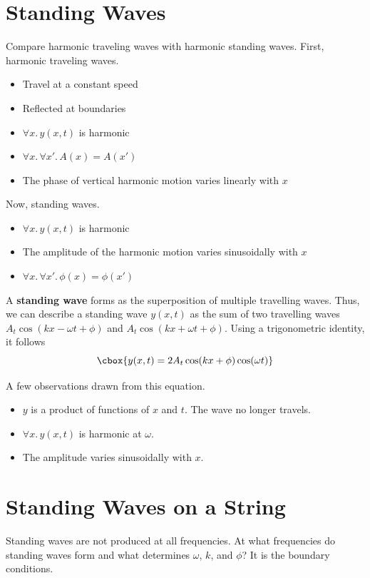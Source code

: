 \documentclass{hw}
\renewcommand\emph[1]{{\bf\color{BlueViolet}#1}}
\begin{document}
\section{Standing Waves}
Compare harmonic traveling waves with harmonic standing waves. First, harmonic
traveling waves.
\begin{itemize}
  \item Travel at a constant speed
  \item Reflected at boundaries
  \item $\forall x.\, y(x, t)$ is harmonic
  \item $\forall x.\, \forall x'.\, A(x) = A(x')$
  \item The phase of vertical harmonic motion varies linearly with $x$
\end{itemize}
Now, standing waves.
\begin{itemize}
  \item $\forall x.\, y(x, t)$ is harmonic
  \item The amplitude of the harmonic motion varies sinusoidally with $x$
  \item $\forall x.\, \forall x'.\, \phi(x) = \phi(x')$
\end{itemize}

A \emph{standing wave} forms as the superposition of multiple travelling waves.
Thus, we can describe a standing wave $y(x,t)$ as the sum of two travelling
waves $A_t\cos(kx - \omega t + \phi)$ and $A_t\cos(kx + \omega t + \phi)$.
Using a trigonometric identity, it follows
\[\cbox{
  y(x,t) = 2A_t \cos(kx + \phi)\cos(\omega t)
}\]

A few observations drawn from this equation.
\begin{itemize}
  \item $y$ is a product of functions of $x$ and $t$. The wave no longer
    travels.
  \item $\forall x.\, y(x,t)$ is harmonic at $\omega$.
  \item The amplitude varies sinusoidally with $x$.
\end{itemize}

\section{Standing Waves on a String}
Standing waves are not produced at all frequencies. At what frequencies do
standing waves form and what determines $\omega$, $k$, and $\phi$? It is the
boundary conditions.
\end{document}
